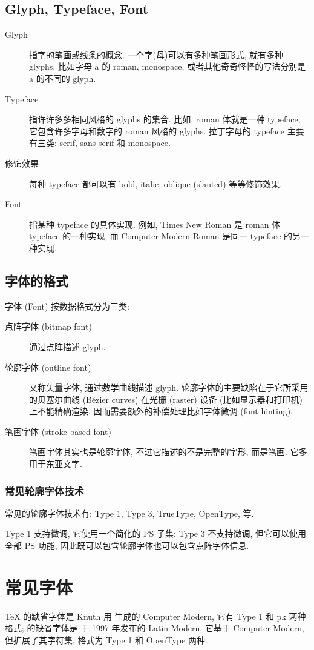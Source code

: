 \documentclass[a4paper,oneside]{book}
\begin{document}
\section{Glyph, Typeface, Font}
\begin{description}
  \item[Glyph] 指字的笔画或线条的概念. 一个字(母)可以有多种笔画形式, 就有多种 glyphs. 比如字母 a 的 roman, monospace, 或者其他奇奇怪怪的写法分别是 a 的不同的 glyph. 
  \item[Typeface] 指许许多多相同风格的 glyphs 的集合. 比如, roman 体就是一种 typeface, 它包含许多字母和数字的 roman 风格的 glyphs. 拉丁字母的 typeface 主要有三类: serif, sans serif 和 monospace.
  \item[修饰效果] 每种 typeface 都可以有 bold, italic, oblique (slanted) 等等修饰效果.
  \item[Font] 指某种 typeface 的具体实现. 例如, Times New Roman 是 roman 体 typeface 的一种实现, 而 Computer Modern Roman 是同一 typeface 的另一种实现.
\end{description}

\section{字体的格式}
字体 (Font) 按数据格式分为三类:
\begin{description}
  \item[点阵字体 (bitmap font)] 通过点阵描述 glyph.
  \item[轮廓字体 (outline font)] 又称矢量字体, 通过数学曲线描述 glyph. 轮廓字体的主要缺陷在于它所采用的贝塞尔曲线 (B\'ezier curves) 在光栅 (raster) 设备 (比如显示器和打印机) 上不能精确渲染, 因而需要额外的补偿处理比如字体微调 (font hinting).
  \item[笔画字体 (stroke-based font)] 笔画字体其实也是轮廓字体, 不过它描述的不是完整的字形, 而是笔画. 它多用于东亚文字.
\end{description}

\subsection{常见轮廓字体技术}
常见的轮廓字体技术有: Type 1, Type 3, TrueType, OpenType, \MF{} 等.

Type 1 支持微调, 它使用一个简化的 PS 子集: Type 3 不支持微调, 但它可以使用全部 PS 功能, 因此既可以包含轮廓字体也可以包含点阵字体信息.



\chapter{常见字体}
\TeX{} 的缺省字体是 Knuth 用 \MF{} 生成的 Computer Modern, 它有 Type 1 和 pk 两种格式; \XeTeX{} 的缺省字体是 \AmS{} 于 1997 年发布的 Latin Modern, 它基于 Computer Modern, 但扩展了其字符集, 格式为 Type 1 和 OpenType 两种.
\end{document}
